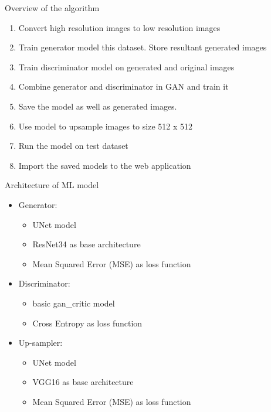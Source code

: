 \documentclass{beamer}
\begin{document}
	\begin{frame}{Overview of the algorithm}
		\begin{enumerate}
			\item Convert high resolution images to low resolution images
			\item Train generator model this dataset. Store resultant generated images
			\item Train discriminator model on generated and original images
			\item Combine generator and discriminator in GAN and train it 
			\item Save the model as well as generated images.
			\item Use model to upsample images to size 512 x 512
			\item Run the model on test dataset
			\item Import the saved models to the web application
		\end{enumerate}
	\end{frame}

	\begin{frame}{Architecture of ML model}
		\begin{itemize}
			\item Generator:
			\begin{itemize}
				\item UNet model
				\item ResNet34 as base architecture
				\item Mean Squared Error (MSE) as loss function
			\end{itemize}
			\item Discriminator:
			\begin{itemize}
				\item basic gan\_critic model
				\item Cross Entropy as loss function
			\end{itemize}
			\item Up-sampler:
			\begin{itemize}
				\item UNet model
				\item VGG16 as base architecture
				\item Mean Squared Error (MSE) as loss function
			\end{itemize}
		\end{itemize}
	\end{frame}
\end{document}
